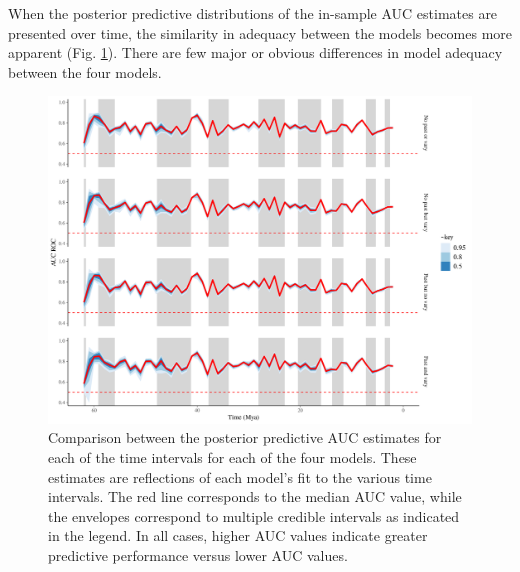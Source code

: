 \documentclass[12pt,letterpaper]{article}
\begin{document}
When the posterior predictive distributions of the in-sample AUC estimates are presented over time, the similarity in adequacy between the models becomes more apparent (Fig. \ref{fig:auc_ts}). There are few major or obvious differences in model adequacy between the four models.
\begin{figure}[ht]
  \centering
  \includegraphics[width=\textwidth,height=0.5\textheight,keepaspectratio=true]{../results/figure/auc_ts}
  \caption{Comparison between the posterior predictive AUC estimates for each of the time intervals for each of the four models. These estimates are reflections of each model's fit to the various time intervals. The red line corresponds to the median AUC value, while the envelopes correspond to multiple credible intervals as indicated in the legend. In all cases, higher AUC values indicate greater predictive performance versus lower AUC values.}
  \label{fig:auc_ts}
\end{figure}
\end{document}

